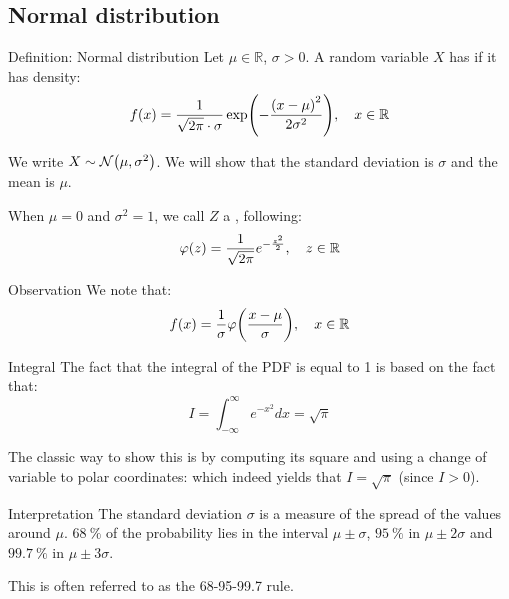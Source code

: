 \documentclass[a4paper]{article}
\begin{document}
\subsection{Normal distribution}
\begin{parag}{Definition: Normal distribution}
    Let $\mu \in \mathbb{R}$, $\sigma > 0$. A random variable $X$ has  if it has density: 
    \[f\left(x\right) = \frac{1}{\sqrt{2\pi} \cdot \sigma} \exp\left(- \frac{\left(x - \mu\right)^2}{2 \sigma ^2}\right), \mathspace x \in \mathbb{R}\]
    
    We write $X \followsdistr \mathcal{N}\left(\mu, \sigma ^2\right)$. We will show that the standard deviation is $\sigma$ and the mean is $\mu$.

    When $\mu = 0$ and $\sigma ^2 = 1$, we call $Z$ a , following: 
    \[\phi\left(z\right) = \frac{1}{\sqrt{2\pi}} e^{-\frac{z^2}{2}}, \mathspace z \in \mathbb{R}\]
    
    \begin{subparag}{Observation}
        We note that: 
        \[f\left(x\right) = \frac{1}{\sigma} \phi\left(\frac{x - \mu}{\sigma}\right), \mathspace x \in \mathbb{R}\]
    \end{subparag}

    \begin{subparag}{Integral}
        The fact that the integral of the PDF is equal to 1 is based on the fact that: 
        \[I = \int_{-\infty}^{\infty} e^{-x^2} dx = \sqrt{\pi}\]
        
        The classic way to show this is by computing its square and using a change of variable to polar coordinates: 
        which indeed yields that $I = \sqrt{\pi}$ (since $I > 0$).
    \end{subparag}

    \begin{subparag}{Interpretation}
        The standard deviation $\sigma$ is a measure of the spread of the values around $\mu$. $\SI{68}{\percent}$ of the probability lies in the interval $\mu \pm \sigma$, $\SI{95}{\percent}$ in $\mu \pm 2 \sigma$ and $\SI{99.7}{\percent}$ in $\mu \pm 3\sigma$.

        This is often referred to as the 68-95-99.7 rule.
    \end{subparag}
\end{parag}
\end{document}
